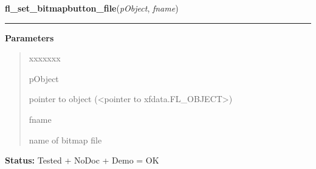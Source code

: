 \hspace{.8\funcindent}\begin{boxedminipage}{\funcwidth}

    \raggedright \textbf{fl\_set\_bitmapbutton\_file}(\textit{pObject}, \textit{fname})

    \vspace{-1.5ex}

    \rule{\textwidth}{0.5\fboxrule}
\setlength{\parskip}{2ex}
\setlength{\parskip}{1ex}
      \textbf{Parameters}
      \vspace{-1ex}

      \begin{quote}
        \begin{Ventry}{xxxxxxx}

          \item[pObject]

          pointer to object ({\textless}pointer to 
          xfdata.FL\_OBJECT{\textgreater})

          \item[fname]

          name of bitmap file

        \end{Ventry}

      \end{quote}

\textbf{Status:} Tested + NoDoc + Demo = OK



    \end{boxedminipage}

    \label{xformslib:library:fl_set_bitmap_file}

    \vspace{0.5ex}

